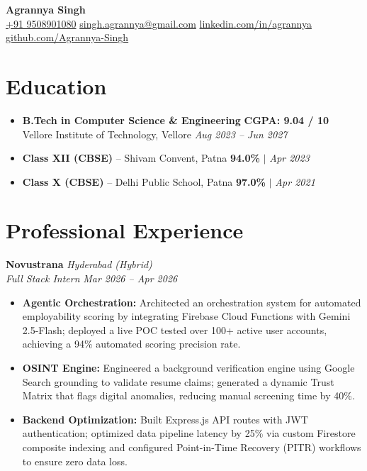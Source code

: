 \documentclass[10pt, a4paper]{article}
\begin{document}
\begin{center}
    {\Large \textbf{Agrannya Singh}} \\[0.3ex]
    \footnotesize
    \faPhoneSquare{} \href{tel:+919508901080}{+91 9508901080} \qquad
    \faEnvelopeSquare{} \href{mailto:singh.agrannya@gmail.com}{singh.agrannya@gmail.com} \qquad
    \faLinkedin{} \href{https://linkedin.com/in/agrannya}{linkedin.com/in/agrannya} \qquad
    \faGithubSquare{} \href{https://github.com/Agrannya-Singh}{github.com/Agrannya-Singh}
\end{center}

\vspace{-1ex}

\section*{Education}
\begin{itemize}[label={}]
    \item \textbf{B.Tech in Computer Science \& Engineering} \hfill \textbf{CGPA: 9.04 / 10} \\
    Vellore Institute of Technology, Vellore \hfill \textit{Aug 2023 -- Jun 2027}
    \item \textbf{Class XII (CBSE)} -- Shivam Convent, Patna \hfill \textbf{94.0\%} $|$ \textit{Apr 2023}
    \item \textbf{Class X (CBSE)} -- Delhi Public School, Patna \hfill \textbf{97.0\%} $|$ \textit{Apr 2021}
\end{itemize}

\section*{Professional Experience}
\noindent
\textbf{Novustrana} \hfill \textit{Hyderabad (Hybrid)} \\
\textit{Full Stack Intern} \hfill \textit{Mar 2026 -- Apr 2026}
\begin{itemize}
    \item \textbf{Agentic Orchestration:} Architected an orchestration system for automated employability scoring by integrating Firebase Cloud Functions with Gemini 2.5-Flash; deployed a live POC tested over 100+ active user accounts, achieving a 94\% automated scoring precision rate.
    \item \textbf{OSINT Engine:} Engineered a background verification engine using Google Search grounding to validate resume claims; generated a dynamic Trust Matrix that flags digital anomalies, reducing manual screening time by 40\%.
    \item \textbf{Backend Optimization:} Built Express.js API routes with JWT authentication; optimized data pipeline latency by 25\% via custom Firestore composite indexing and configured Point-in-Time Recovery (PITR) workflows to ensure zero data loss.
\end{itemize}
\end{document}

